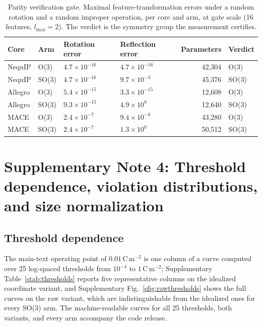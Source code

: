 \begin{table}[htbp]
\centering
\caption{Parity verification gate. Maximal feature-transformation errors under a random rotation and a random improper operation, per core and arm, at gate scale (16 features, $l_{\max}=2$). The verdict is the symmetry group the measurement certifies.}
\label{stab:gate}
\scriptsize
\begin{tabular}{llllrl}
\toprule
Core & Arm & Rotation error & Reflection error & Parameters & Verdict \\
\midrule
NequIP & O(3) & $4.7\times10^{-16}$ & $4.7\times10^{-16}$ & 42{,}304 & O(3) \\
NequIP & SO(3) & $4.7\times10^{-16}$ & $9.7\times10^{-3}$ & 45{,}376 & SO(3) \\
Allegro & O(3) & $5.4\times10^{-15}$ & $3.3\times10^{-15}$ & 12{,}608 & O(3) \\
Allegro & SO(3) & $9.3\times10^{-15}$ & $4.9\times10^{0}$ & 12{,}640 & SO(3) \\
MACE & O(3) & $2.4\times10^{-7}$ & $9.4\times10^{-8}$ & 43{,}280 & O(3) \\
MACE & SO(3) & $2.4\times10^{-7}$ & $1.3\times10^{0}$ & 50{,}512 & SO(3) \\
\bottomrule
\end{tabular}
\end{table}

\section*{Supplementary Note 4: Threshold dependence, violation distributions, and size normalization}

\subsection*{Threshold dependence}

The main-text operating point of $0.01$\,C\,m$^{-2}$ is one column of a curve computed over 25 log-spaced thresholds from $10^{-4}$ to $1$\,C\,m$^{-2}$; Supplementary Table~\ref{stab:thresholds} reports five representative columns on the idealized coordinate variant, and Supplementary Fig.~\ref{sfig:rawthresholds} shows the full curves on the raw variant, which are indistinguishable from the idealized ones for every SO(3) arm. The machine-readable curves for all 25 thresholds, both variants, and every arm accompany the code release.

